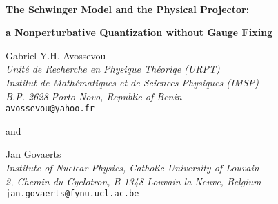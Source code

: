 \documentclass[a4paper,11pt]{article}
\begin{document}
%
\begin{titlepage}
\begin{centering}
 
{\ }\vspace{2cm}
 
{\Large\bf The Schwinger Model and the Physical Projector:}

\vspace{5pt}

{\Large\bf a Nonperturbative Quantization without Gauge Fixing}

\vspace{2cm}

Gabriel Y.H. Avossevou\\
\vspace{0.5cm}
{\em Unit\'e de Recherche en Physique Th\'eoriqe (URPT)}\\
{\em Institut de Math\'ematiques et de Sciences Physiques (IMSP)}\\
{\em B.P. 2628 Porto-Novo, Republic of Benin}\\
{\tt avossevou@yahoo.fr}

\vspace{0.5cm}

and

\vspace{0.5cm}

Jan Govaerts\\
\vspace{1.0cm}
{\em Institute of Nuclear Physics, Catholic University of Louvain}\\
{\em 2, Chemin du Cyclotron, B-1348 Louvain-la-Neuve, Belgium}\\
{\tt jan.govaerts@fynu.ucl.ac.be}

\vspace{1.5cm}

\begin{abstract}

\noindent
Based on the physical projector approach, a nonpertubative quantization of 
the massless Schwinger model is considered which does not require any 
gauge fixing. The spectrum of physical states,
readily identified following a diagonalization of the operator
algebra, is that of a massive pseudoscalar field, namely 
the electric field having acquired a mass proportional to the gauge
coupling constant. The physical spectrum need not be identified with confined 
bound fermion-antifermion pairs, an interpretation which one is otherwise 
led to given whatever gauge fixing procedure but 
which is not void of gauge fixing artefacts.


\end{abstract}
\end{centering}
\end{titlepage}
\end{document}
